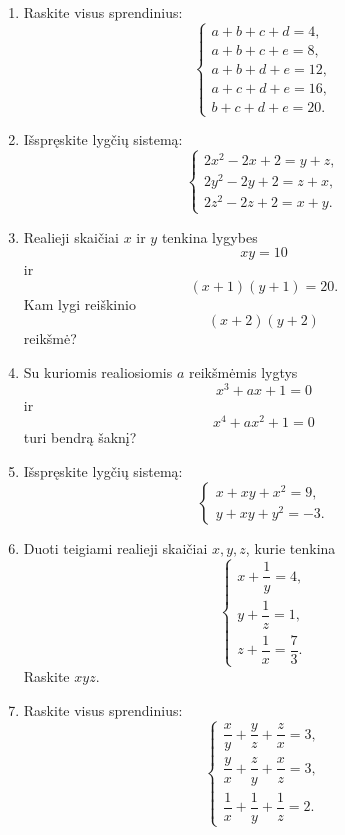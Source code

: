 \documentclass[11pt,a4paper]{scrartcl}
\begin{document}
\begin{enumerate}
    \renewcommand{\labelenumi}{\textbf{\theenumi.}}

    \item Raskite visus sprendinius:
    \[
    \left\{
    \begin{array}{l}
    a+b+c+d=4,\\
    a+b+c+e=8,\\
    a+b+d+e=12,\\
    a+c+d+e=16,\\
    b+c+d+e=20.
    \end{array}
    \right.
    \]

    \item Išspręskite lygčių sistemą:
    \[
    \left\{
    \begin{array}{l}
    2x^2-2x+2=y+z,\\
    2y^2-2y+2=z+x,\\
    2z^2-2z+2=x+y.
    \end{array}
    \right.
    \]

    \item Realieji skaičiai $x$ ir $y$ tenkina lygybes
    \[
    xy=10
    \]
    ir
    \[
    (x+1)(y+1)=20.
    \]
    Kam lygi reiškinio
    \[
    (x+2)(y+2)
    \]
    reikšmė?

    \item Su kuriomis realiosiomis $a$ reikšmėmis lygtys
    \[
    x^3+ax+1=0
    \]
    ir
    \[
    x^4+ax^2+1=0
    \]
    turi bendrą šaknį?

    \item Išspręskite lygčių sistemą:
    \[
    \left\{
    \begin{array}{l}
    x+xy+x^2=9,\\
    y+xy+y^2=-3.
    \end{array}
    \right.
    \]

    \item Duoti teigiami realieji skaičiai $x,y,z$, kurie tenkina
    \[
    \left\{
    \begin{array}{l}
    x+\dfrac1y=4,\\[0.2cm]
    y+\dfrac1z=1,\\[0.2cm]
    z+\dfrac1x=\dfrac73.
    \end{array}
    \right.
    \]
    Raskite $xyz$.

    \item Raskite visus sprendinius:
    \[
    \left\{
    \begin{array}{l}
    \dfrac{x}{y}+\dfrac{y}{z}+\dfrac{z}{x}=3,\\[0.3cm]
    \dfrac{y}{x}+\dfrac{z}{y}+\dfrac{x}{z}=3,\\[0.3cm]
    \dfrac1x+\dfrac1y+\dfrac1z=2.
    \end{array}
    \right.
    \]


\end{enumerate}
\end{document}

